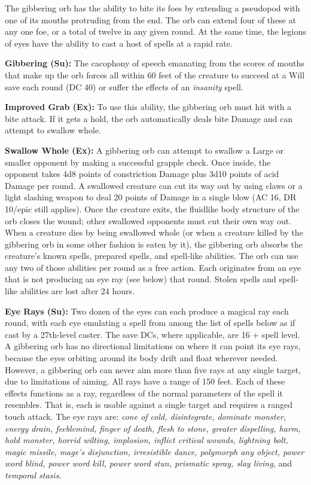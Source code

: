 \documentclass{article}
\begin{document}
{The gibbering orb has the ability to bite its foes by extending a pseudopod with 
one of its mouths protruding from the end. The orb can extend four of these at 
any one foe, or a total of twelve in any given round. At the same time, the legions 
of eyes have the ability to cast a host of spells at a rapid rate. 

\textbf{Gibbering (Su):} The cacophony of speech emanating from the scores of mouths 
that make up the orb forces all within 60 feet of the creature to succeed at a 
Will save each round (DC 40) or suffer the effects of an \textit{insanity }spell. 

\textbf{Improved Grab (Ex):} To use this ability, the gibbering orb must hit with 
a bite attack. If it gets a hold, the orb automatically deals bite Damage and can 
attempt to swallow whole. 

\textbf{Swallow Whole (Ex):} A gibbering orb can attempt to swallow a Large or 
smaller opponent by making a successful grapple check. Once inside, the opponent 
takes 4d8 points of constriction Damage plus 3d10 points of acid Damage per round. 
A swallowed creature can cut its way out by using claws or a light slashing weapon 
to deal 20 points of Damage in a single blow (AC 16, DR 10/epic still applies). 
Once the creature exits, the fluidlike body structure of the orb closes the wound; 
other swallowed opponents must cut their own way out. When a creature dies by being 
swallowed whole (or when a creature killed by the gibbering orb in some other fashion 
is eaten by it), the gibbering orb absorbs the creature's known spells, prepared 
spells, and spell-like abilities. The orb can use any two of those abilities per 
round as a free action. Each originates from an eye that is not producing an eye 
ray (see below) that round. Stolen spells and spell-like abilities are lost after 
24 hours. 

\textbf{Eye Rays (Su):} Two dozen of the eyes can each produce a magical ray each 
round, with each eye emulating a spell from among the list of spells below as if 
cast by a 27th-level caster. The save DCs, where applicable, are 16 + spell level. 
A gibbering orb has no directional limitations on where it can point its eye rays, 
because the eyes orbiting around its body drift and float wherever needed. However, 
a gibbering orb can never aim more than five rays at any single target, due to 
limitations of aiming. All rays have a range of 150 feet. Each of these effects 
functions as a ray, regardless of the normal parameters of the spell it resembles. 
That is, each is usable against a single target and requires a ranged touch attack. 
The eye rays are: \textit{cone of cold, disintegrate, dominate monster, energy 
drain, feeblemind, finger of death, flesh to stone, greater dispelling, harm, hold 
monster, horrid wilting, implosion, inflict critical wounds, lightning bolt, magic 
missile, mage's disjunction, irresistible dance, polymorph any object, power word 
blind, power word kill, power word stun, prismatic spray, slay living, }and \textit{temporal 
stasis. }

}
\end{document}
